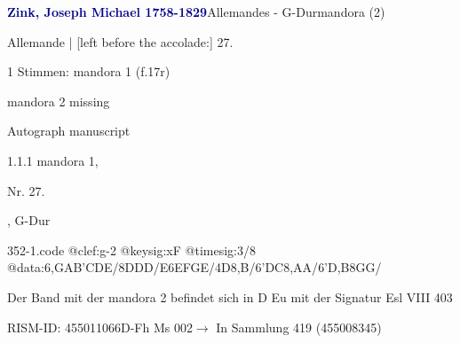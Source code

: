 \documentclass[twocolumn, 12pt]{book}
\begin{document}
\par \vspace{16pt} \textcolor{darkblue}{\textbf{Zink, Joseph Michael  1758-1829}}\hfillplus{\textbf{[352]}}\newline Allemandes - G-Dur\newline mandora (2)
\par \begin{itshape}[f.17r, at left:] Allemande | [left before the accolade:] 27.\end{itshape} 
\par \textcolor{darkblue}{}  1 Stimmen: mandora 1  (f.17r)\newline \begin{small} mandora 2 missing\end{small} \newline Autograph manuscript
\par 1.1.1  mandora 1, \begin{itshape}Nr. 27.\end{itshape}, G-Dur  
\begin{filecontents*}{352-1.code}
@clef:g-2
@keysig:xF
@timesig:3/8
@data:{6,GA}{B'C}DE/8DDD/E{6EF}{GE}/4D8,B/{6'DC}8,AA/{6'D,B}8GG/
\end{filecontents*}
\newline %
\par Der Band mit der mandora 2 befindet sich in D Eu mit der Signatur Esl VIII 403
\par RISM-ID: 455011066\newline D-Fh  Ms 002\newline $\rightarrow$ In Sammlung 419 (455008345)
      
\end{document}
